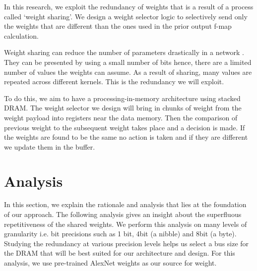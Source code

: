 \documentclass[conference]{IEEEtran}
\begin{document}
In this research, we exploit the redundancy of weights that is a result of a process called `weight sharing'\cite{han2015deep}. We design a weight selector logic to selectively send only the weights that are different than the ones used in the prior output f-map calculation. 

Weight sharing can reduce the number of parameters drastically in a network \cite{han2016eie}. They can be presented by using a small number of bits hence, there are a limited number of values the weights can assume. As a result of sharing, many values are repeated across different kernels. This is the redundancy we will exploit.

To do this, we aim to have a processing-in-memory architecture  using stacked DRAM. The weight selector we design will bring in chunks of weight from the weight payload into registers near the data memory. Then the comparison of previous weight to the subsequent weight takes place and a decision is made. If the weights are found to be the same no action is taken and if they are different we update them in the buffer. 

%



\section{Analysis}

In this section, we explain the rationale and analysis that lies at the foundation of our approach. The following analysis gives an insight about the superfluous repetitiveness of the shared weights. We perform this analysis on many levels of granularity i.e. bit precisions such as 1 bit, 4bit (a nibble) and 8bit (a byte). Studying the redundancy at various precision levels helps us select a bus size for the DRAM that will be best suited for our architecture and design. For this analysis, we use pre-trained AlexNet weights as our source for weight\cite{alexnet_matlab}.
\end{document}
